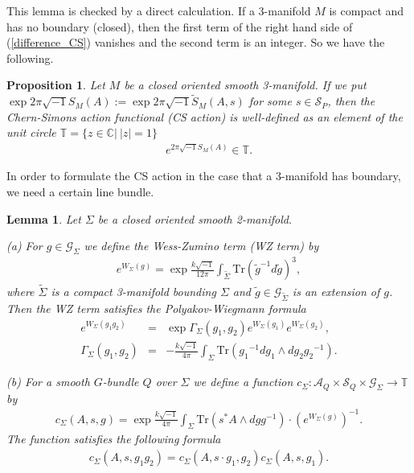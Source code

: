 \documentclass[a4paper,a4paper]{article}
\newtheorem{prop}[thm]{Proposition}
\newtheorem{lem}[thm]{Lemma}
\theoremstyle{definition}
\theoremstyle{remark}
\newcommand{\C}{\mathbb{C}}
\newcommand{\T}{\mathbb{T}}
\newcommand{\A}{\mathcal{A}}
\newcommand{\G}{\mathcal{G}}
\newcommand{\Tr}{\mathrm{Tr}}
\renewcommand{\S}{\mathcal{S}}
\begin{document}
This lemma is checked by a direct calculation. If a 3-manifold $M$ is compact and has no boundary (closed), then the first term of the right hand side of (\ref{difference_CS}) vanishes and the second term is an integer. So we have the following.

\begin{prop}
Let $M$ be a closed oriented smooth 3-manifold. If we put $\exp 2\pi \sqrt{-1} S_M(A) := \exp 2\pi \sqrt{-1} \tilde{S}_M (A,s)$ for some $s \in \S_P$, then the \textit{Chern-Simons action functional} (CS action) is well-defined as an element of the unit circle $\T = \{ z \in \C |\ |z| = 1 \}$
\begin{eqnarray}
e^{ 2\pi\sqrt{-1} S_M(A) } \in \T.
\end{eqnarray}
\end{prop}

In order to formulate the CS action in the case that a 3-manifold has boundary, we need a certain line bundle.

\begin{lem}
Let $\Sigma$ be a closed oriented smooth 2-manifold. 

(a) For $g \in \G_\Sigma$ we define the \textit{Wess-Zumino term (WZ term)} by
\begin{eqnarray}
e^{ W_\Sigma(g) } = \exp \frac{k\sqrt{-1}}{12\pi} 
\int_{\tilde{\Sigma}} \Tr( \tilde{g}^{-1} d\tilde{g} )^3 ,
\label{WZ_closed}
\end{eqnarray}
where $\tilde{\Sigma}$ is a compact 3-manifold bounding $\Sigma$ and $\tilde{g} \in \G_{\tilde{\Sigma}}$ is an extension of $g$. Then the WZ term satisfies the Polyakov-Wiegmann formula
\begin{eqnarray}
e^{ W_\Sigma(g_1 g_2) } & = &
\exp \Gamma_\Sigma(g_1,g_2) e^{ W_\Sigma(g_1) } e^{ W_\Sigma(g_2) } ,
\label{PW-formula_1} \\
\Gamma_\Sigma(g_1, g_2) & = &
-\frac{k\sqrt{-1}}{4\pi} \int_\Sigma 
\Tr( {g_1}^{-1}dg_1 \wedge dg_2 {g_2}^{-1}) .
\label{cocycle_2}
\end{eqnarray}

(b) For a smooth $G$-bundle $Q$ over $\Sigma$ we define a function $c_\Sigma : \A_Q \times \S_Q \times \G_\Sigma \to \T$ by
\begin{eqnarray}
c_\Sigma(A,s,g) = 
\exp \frac{k\sqrt{-1}}{4\pi} \int_\Sigma \Tr(s^*A \wedge dgg^{-1}) \cdot 
\left( e^{W_\Sigma(g)} \right)^{-1} . \label{cocycle_1}
\end{eqnarray}
The function satisfies the following formula
\begin{eqnarray}
c_\Sigma(A,s,g_1 g_2) = c_\Sigma(A,s \cdot g_1,g_2) c_\Sigma(A,s,g_1) .
\label{cocycle_condition_1}
\end{eqnarray}
\end{lem}
\end{document}
